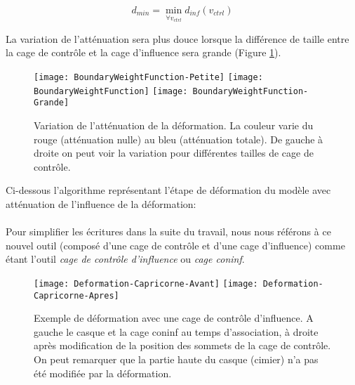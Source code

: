 \begin{equation}
  d_{min} = \min_{\forall v_{ctrl}} d_{inf}(v_{ctrl})
\end{equation}

La variation de l'atténuation sera plus douce lorsque la différence de taille
entre la cage de contrôle et la cage d'influence sera grande (Figure
\ref{MELBou}).

\begin{figure}[ht]
  \begin{center}
    \texttt{[image: BoundaryWeightFunction-Petite]}
    \texttt{[image: BoundaryWeightFunction]}
    \texttt{[image: BoundaryWeightFunction-Grande]}

    \caption[Variation de l'atténuation de la déformation] {Variation de
l'atténuation de la déformation. La couleur varie du rouge (atténuation nulle)
au bleu (atténuation totale). De gauche à droite on peut voir la variation
pour différentes tailles de cage de contrôle.}

    \label{MELBou}
  \end{center}
\end{figure}

Ci-dessous l'algorithme représentant l'étape de déformation du modèle avec
atténuation de l'influence de la déformation: \\

 \\

Pour simplifier les écritures dans la suite du travail, nous nous référons à
ce nouvel outil (composé d'une cage de contrôle et d'une cage d'influence)
comme étant l'outil \textit{cage de contrôle d'influence} ou \textit{cage
coninf}.

\begin{figure}[ht]
  \begin{center}
    \texttt{[image: Deformation-Capricorne-Avant]}
    \texttt{[image: Deformation-Capricorne-Apres]}

    \caption[Exemple de déformation cage de contrôle d'influence] {Exemple de
déformation avec une cage de contrôle d'influence. A gauche le casque et la
cage coninf au temps d'association, à droite après modification de la position
des sommets de la cage de contrôle. On peut remarquer que la partie haute du
casque (cimier) n'a pas été modifiée par la déformation.}

  \end{center}
\end{figure}

